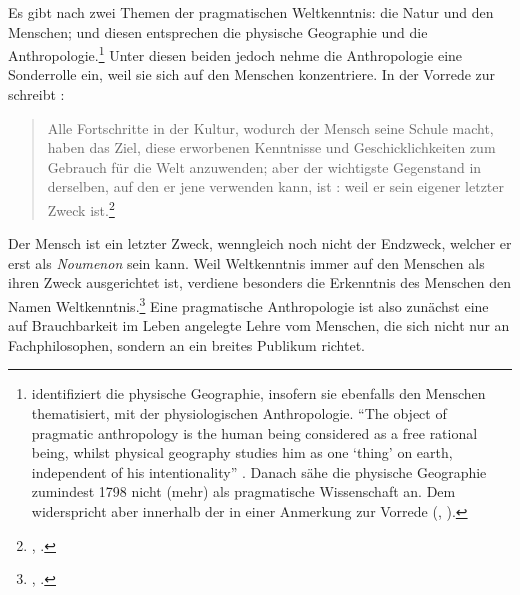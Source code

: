 Es gibt nach  zwei Themen der pragmatischen Weltkenntnis:
die Natur und den Menschen; und diesen entsprechen die physische Geographie und
die Anthropologie.\footnote{
identifiziert die physische Geographie, insofern sie ebenfalls den Menschen
thematisiert, mit der
physiologischen Anthropologie. \enquote{The object of pragmatic anthropology is
the human being considered as a free rational being, whilst physical geography
studies him as one \enquote{thing} on earth, independent of his intentionality}
\parencite[63]{Cohen:KantandtheHumanSciences2009}. Danach sähe  die
physische Geographie zumindest 1798 nicht (mehr) als pragmatische Wissenschaft
an. Dem widerspricht  aber innerhalb der
 in einer Anmerkung zur Vorrede
(\cite[vgl.][BA~xiii--xiv]{Kant:AnthropologieinpragmatischerHinsicht1977},
\cite[][VII: 122.8--15]{Kant:GesammelteWerke1900ff.}).} Unter diesen beiden
jedoch nehme die Anthropologie eine Sonderrolle ein, weil sie sich auf den
Menschen konzentriere. In der Vorrede zur  schreibt :
\begin{quote}
  Alle Fortschritte in der Kultur, wodurch der Mensch seine Schule macht, haben
  das Ziel, diese erworbenen Kenntnisse und Geschicklichkeiten zum Gebrauch für
  die Welt anzuwenden; aber der wichtigste Gegenstand in derselben, auf den er
  jene verwenden kann, ist : weil er sein eigener letzter Zweck
  ist.\footnote{\cite[][BA~iii]{Kant:AnthropologieinpragmatischerHinsicht1977},
  \cite[][VII: 119.2--6]{Kant:GesammelteWerke1900ff.}.}
\end{quote}
Der Mensch ist ein letzter Zweck, wenngleich noch nicht der Endzweck, welcher
er erst als \emph{Noumenon} sein kann. Weil Weltkenntnis immer auf den Menschen
als ihren Zweck ausgerichtet ist, verdiene besonders die Erkenntnis des Menschen den Namen
Weltkenntnis.\footnote{\cite[Vgl.][BA~iii--iv]{Kant:AnthropologieinpragmatischerHinsicht1977},
\cite[][VII: 119.6--8]{Kant:GesammelteWerke1900ff.}.} 
Eine pragmatische Anthropologie ist also zunächst eine auf Brauchbarkeit im Leben angelegte Lehre vom
Menschen, die sich nicht nur an Fachphilosophen, sondern an ein breites Publikum richtet.

